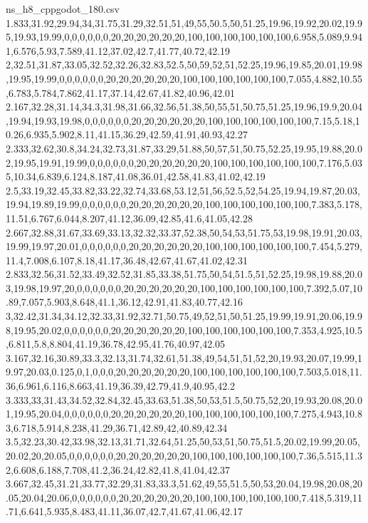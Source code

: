 \begin{filecontents*}[overwrite]{ns_h8_cppgodot_180.csv}
1.833,31.92,29.94,34,31.75,31.29,32.51,51,49,55,50.5,50,51.25,19.96,19.92,20.02,19.95,19.93,19.99,0,0,0,0,0,0,20,20,20,20,20,20,100,100,100,100,100,100,6.958,5.089,9.941,6.576,5.93,7.589,41.12,37.02,42.7,41.77,40.72,42.19
2,32.51,31.87,33.05,32.52,32.26,32.83,52.5,50,59,52,51,52.25,19.96,19.85,20.01,19.98,19.95,19.99,0,0,0,0,0,0,20,20,20,20,20,20,100,100,100,100,100,100,7.055,4.882,10.55,6.783,5.784,7.862,41.17,37.14,42.67,41.82,40.96,42.01
2.167,32.28,31.14,34.3,31.98,31.66,32.56,51.38,50,55,51,50.75,51.25,19.96,19.9,20.04,19.94,19.93,19.98,0,0,0,0,0,0,20,20,20,20,20,20,100,100,100,100,100,100,7.15,5.18,10.26,6.935,5.902,8.11,41.15,36.29,42.59,41.91,40.93,42.27
2.333,32.62,30.8,34.24,32.73,31.87,33.29,51.88,50,57,51,50.75,52.25,19.95,19.88,20.02,19.95,19.91,19.99,0,0,0,0,0,0,20,20,20,20,20,20,100,100,100,100,100,100,7.176,5.035,10.34,6.839,6.124,8.187,41.08,36.01,42.58,41.83,41.02,42.19
2.5,33.19,32.45,33.82,33.22,32.74,33.68,53.12,51,56,52.5,52,54.25,19.94,19.87,20.03,19.94,19.89,19.99,0,0,0,0,0,0,20,20,20,20,20,20,100,100,100,100,100,100,7.383,5.178,11.51,6.767,6.044,8.207,41.12,36.09,42.85,41.6,41.05,42.28
2.667,32.88,31.67,33.69,33.13,32.32,33.37,52.38,50,54,53,51.75,53,19.98,19.91,20.03,19.99,19.97,20.01,0,0,0,0,0,0,20,20,20,20,20,20,100,100,100,100,100,100,7.454,5.279,11.4,7.008,6.107,8.18,41.17,36.48,42.67,41.67,41.02,42.31
2.833,32.56,31.52,33.49,32.52,31.85,33.38,51.75,50,54,51.5,51,52.25,19.98,19.88,20.03,19.98,19.97,20,0,0,0,0,0,0,20,20,20,20,20,20,100,100,100,100,100,100,7.392,5.07,10.89,7.057,5.903,8.648,41.1,36.12,42.91,41.83,40.77,42.16
3,32.42,31.34,34.12,32.33,31.92,32.71,50.75,49,52,51,50,51.25,19.99,19.91,20.06,19.98,19.95,20.02,0,0,0,0,0,0,20,20,20,20,20,20,100,100,100,100,100,100,7.353,4.925,10.5,6.811,5.8,8.804,41.19,36.78,42.95,41.76,40.97,42.05
3.167,32.16,30.89,33.3,32.13,31.74,32.61,51.38,49,54,51,51,52,20,19.93,20.07,19.99,19.97,20.03,0.125,0,1,0,0,0,20,20,20,20,20,20,100,100,100,100,100,100,7.503,5.018,11.36,6.961,6.116,8.663,41.19,36.39,42.79,41.9,40.95,42.2
3.333,33,31.43,34.52,32.84,32.45,33.63,51.38,50,53,51.5,50.75,52,20,19.93,20.08,20.01,19.95,20.04,0,0,0,0,0,0,20,20,20,20,20,20,100,100,100,100,100,100,7.275,4.943,10.83,6.718,5.914,8.238,41.29,36.71,42.89,42,40.89,42.34
3.5,32.23,30.42,33.98,32.13,31.71,32.64,51.25,50,53,51,50.75,51.5,20.02,19.99,20.05,20.02,20,20.05,0,0,0,0,0,0,20,20,20,20,20,20,100,100,100,100,100,100,7.36,5.515,11.32,6.608,6.188,7.708,41.2,36.24,42.82,41.8,41.04,42.37
3.667,32.45,31.21,33.77,32.29,31.83,33.3,51.62,49,55,51.5,50,53,20.04,19.98,20.08,20.05,20.04,20.06,0,0,0,0,0,0,20,20,20,20,20,20,100,100,100,100,100,100,7.418,5.319,11.71,6.641,5.935,8.483,41.11,36.07,42.7,41.67,41.06,42.17

\end{filecontents*}

